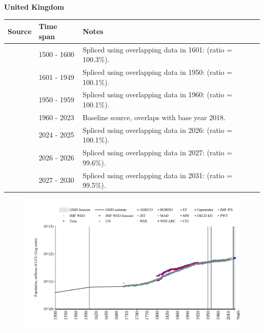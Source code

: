 \documentclass[12pt,a4paper,landscape]{article}
\begin{document}
\begin{adjustbox}{max totalsize={\paperwidth}{\paperheight},center}
\begin{minipage}[t][\textheight][t]{\textwidth}
\vspace*{0.5cm}
{}
\begin{center}
{\Large\bfseries United Kingdom}
\end{center}
\vspace{0.5cm}
\begin{table}[H]
\centering
\small
\begin{tabular}{|l|l|l|}
\hline
\textbf{Source} & \textbf{Time span} & \textbf{Notes} \\
\hline
\rowcolor{white}\cite{MAD}& 1500 - 1600 &Spliced using overlapping data in 1601: (ratio = 100.3\%).\\
\rowcolor{lightgray}\cite{CS1_GBR}& 1601 - 1949 &Spliced using overlapping data in 1950: (ratio = 100.1\%).\\
\rowcolor{white}\cite{IMF_IFS}& 1950 - 1959 &Spliced using overlapping data in 1960: (ratio = 100.1\%).\\
\rowcolor{lightgray}\cite{WDI}& 1960 - 2023 &Baseline source, overlaps with base year 2018.\\
\rowcolor{white}\cite{OECD_EO}& 2024 - 2025 &Spliced using overlapping data in 2026: (ratio = 100.1\%).\\
\rowcolor{lightgray}\cite{AMECO}& 2026 - 2026 &Spliced using overlapping data in 2027: (ratio = 99.6\%).\\
\rowcolor{white}\cite{Gapminder}& 2027 - 2030 &Spliced using overlapping data in 2031: (ratio = 99.5\%).\\
\hline
\end{tabular}
\end{table}
\begin{figure}[H]
\centering
\includegraphics[width=\textwidth,height=0.6\textheight,keepaspectratio]{graphs/GBR_pop.pdf}
\end{figure}
\end{minipage}
\end{adjustbox}
\end{document}
